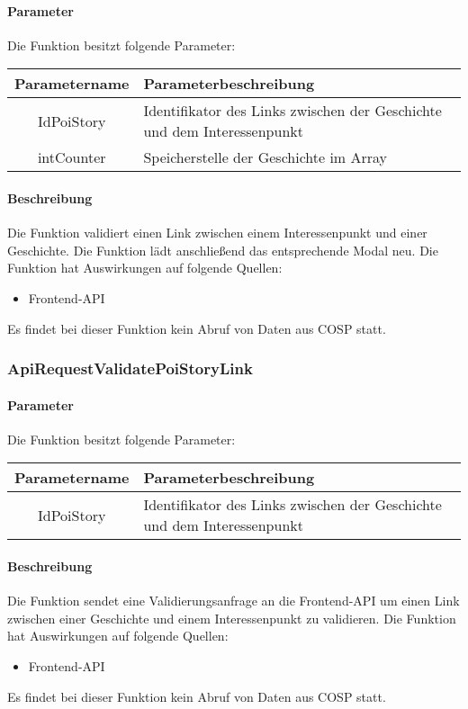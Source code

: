 \paragraph{Parameter} Die Funktion besitzt folgende Parameter:
\begin{table}[H]
	\begin{tabular}{|c|p{11cm}|}
		\hline
		\textbf{Parametername} & \textbf{Parameterbeschreibung} \\ \hline
		IdPoiStory & Identifikator des Links zwischen der Geschichte und dem Interessenpunkt \\ \hline
		intCounter & Speicherstelle der Geschichte im Array \\ \hline
	\end{tabular}
\end{table}
\paragraph{Beschreibung} Die Funktion validiert einen Link zwischen einem Interessenpunkt und einer Geschichte. Die Funktion lädt anschließend das entsprechende Modal neu. Die Funktion hat Auswirkungen auf folgende Quellen:
\begin{itemize}
	\item Frontend-API
\end{itemize}
Es findet bei dieser Funktion kein Abruf von Daten aus {\glqq COSP\grqq} statt.
\subsubsection{ApiRequestValidatePoiStoryLink}
\paragraph{Parameter} Die Funktion besitzt folgende Parameter:
\begin{table}[H]
	\begin{tabular}{|c|p{11cm}|}
		\hline
		\textbf{Parametername} & \textbf{Parameterbeschreibung} \\ \hline
		IdPoiStory & Identifikator des Links zwischen der Geschichte und dem Interessenpunkt \\ \hline
	\end{tabular}
\end{table}
\paragraph{Beschreibung} Die Funktion sendet eine Validierungsanfrage an die Frontend-API um einen Link zwischen einer Geschichte und einem Interessenpunkt zu validieren. Die Funktion hat Auswirkungen auf folgende Quellen:
\begin{itemize}
	\item Frontend-API
\end{itemize}
Es findet bei dieser Funktion kein Abruf von Daten aus {\glqq COSP\grqq} statt.
